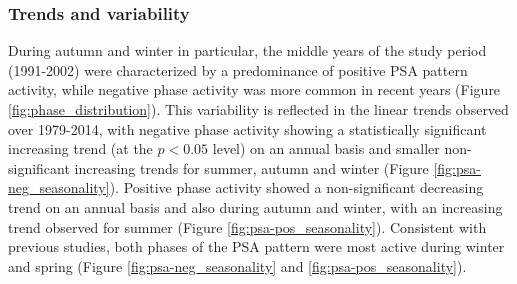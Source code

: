 \subsubsection{Trends and variability}

During autumn and winter in particular, the middle years of the study period (1991-2002) were characterized by a predominance of positive PSA pattern activity, while negative phase activity was more common in recent years (Figure \ref{fig:phase_distribution}). This variability is reflected in the linear trends observed over 1979-2014, with negative phase activity showing a statistically significant increasing trend (at the $p < 0.05$ level) on an annual basis and smaller non-significant increasing trends for summer, autumn and winter (Figure \ref{fig:psa-neg_seasonality}). Positive phase activity showed a non-significant decreasing trend on an annual basis and also during autumn and winter, with an increasing trend observed for summer (Figure \ref{fig:psa-pos_seasonality}). Consistent with previous studies, both phases of the PSA pattern were most active during winter and spring (Figure \ref{fig:psa-neg_seasonality} and \ref{fig:psa-pos_seasonality}). 

